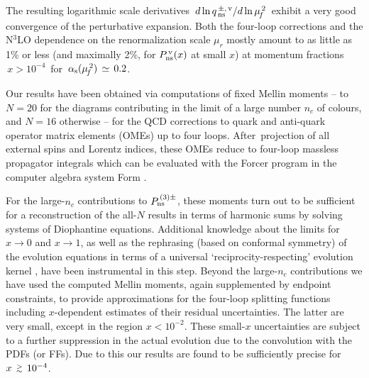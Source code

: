 \documentclass[12pt]{article}
\newcommand{\gsim}{\raisebox{-0.07cm}{$\:\:\stackrel{>}{{\scriptstyle
 \sim}}\:\: $} }
\newcommand{\als}{\alpha_{\rm s}}
\def\nc{{n_c}}
\begin{document}
The resulting logarithmic scale derivatives 
$\,d \ln q_{\,\rm ns}^{\,\pm,\,\rm v} / d\ln \mu_{\!f}^{\,2}\,$ exhibit a 
very good convergence of the perturbative expansion. 
Both the four-loop corrections and the N$^3$LO dependence on the 
renormalization scale $\mu_r^{}$ mostly amount to as little as 1\% or less 
(and maximally 2\%, for $P_{\rm ns}^{\,\rm v}(x)$ at small $x$) at momentum 
fractions $\,x > 10^{-4}\,$ for $\,\als(\mu_{\!f}^{\,2}) \,\simeq\, 0.2$.

Our results have been obtained via computations of fixed Mellin moments 
-- to $N=20$ for the diagrams contributing in the limit of a large number 
$\nc$ of colours, and $N=16$ otherwise -- 
for the QCD corrections to quark and anti-quark operator matrix elements 
(OMEs) up to four loops.
After~projection of all external spins and Lorentz indices, these OMEs reduce 
to four-loop massless propagator integrals which can be evaluated with the 
{\sc Forcer} program \cite{Ruijl:2017cxj} in the computer algebra system 
{\sc Form} \cite{Vermaseren:2000nd,Kuipers:2012rf,Tentyukov:2007mu,%
Ruijl:2017dtg}.
 
For the large-$\nc$ contributions to $P_{\rm ns}^{\,(3)\pm}$, these moments 
turn out to be sufficient for a reconstruction of the all-$N$ results in terms
of harmonic sums by solving systems of Diophantine equations. 
Additional knowledge about the limits for $x \to 0 $ and $x \to 1$, as well as 
the rephrasing (based on conformal symmetry) of the evolution equations in 
terms of a universal `reciprocity-respecting' evolution kernel 
\cite{Dokshitzer:2005bf,Dokshitzer:2006nm,Basso:2006nk}, have been instrumental
in this step. 
%
Beyond the large-$n_c$ contributions we have used the computed Mellin moments, 
again supplemented by endpoint constraints, to provide approximations for the 
four-loop splitting functions including $x$-dependent estimates of 
their residual uncertainties. The latter are very small, except in the region 
$x < 10^{-2}$. 
These small-$x$ uncertainties are subject to a further suppression in the 
actual evolution due to the convolution with the PDFs (or FFs). Due to this 
our results are found to be sufficiently precise for $x \gsim 10^{-4}$.
\end{document}
